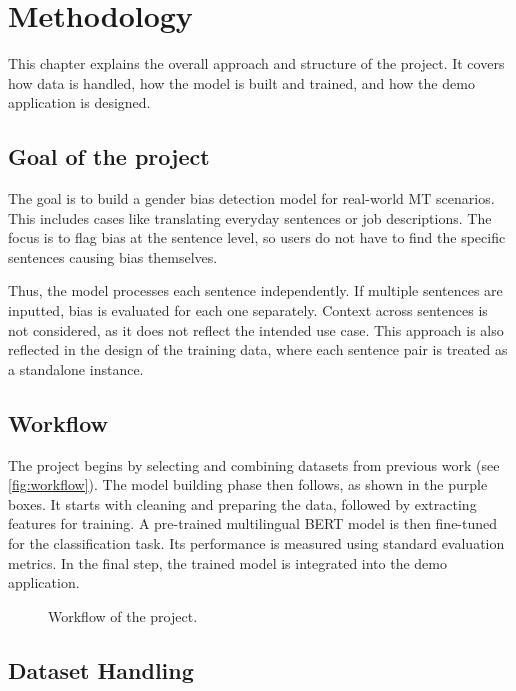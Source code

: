\chapter{Methodology}
This chapter explains the overall approach and structure of the project. It covers how data is handled, how the model is built and trained, and how the demo application is designed.

\section{Goal of the project}
The goal is to build a gender bias detection model for real-world MT scenarios. This includes cases like translating everyday sentences or job descriptions. The focus is to flag bias at the sentence level, so users do not have to find the specific sentences causing bias themselves.

Thus, the model processes each sentence independently. If multiple sentences are inputted, bias is evaluated for each one separately. Context across sentences is not considered, as it does not reflect the intended use case. This approach is also reflected in the design of the training data, where each sentence pair is treated as a standalone instance.

\section{Workflow}
The project begins by selecting and combining datasets from previous work (see \autoref{fig:workflow}). The model building phase then follows, as shown in the purple boxes. It starts with cleaning and preparing the data, followed by extracting features for training. A pre-trained multilingual BERT model is then fine-tuned for the classification task. Its performance is measured using standard evaluation metrics. In the final step, the trained model is integrated  into the demo application.

\vspace{1cm} 
\begin{figure}[htb]
    \centering
    \scalebox{0.8}{}
    \caption{Workflow of the project.}
    \label{fig:workflow}
\end{figure}
\vspace{1cm} 

\section{Dataset Handling}

